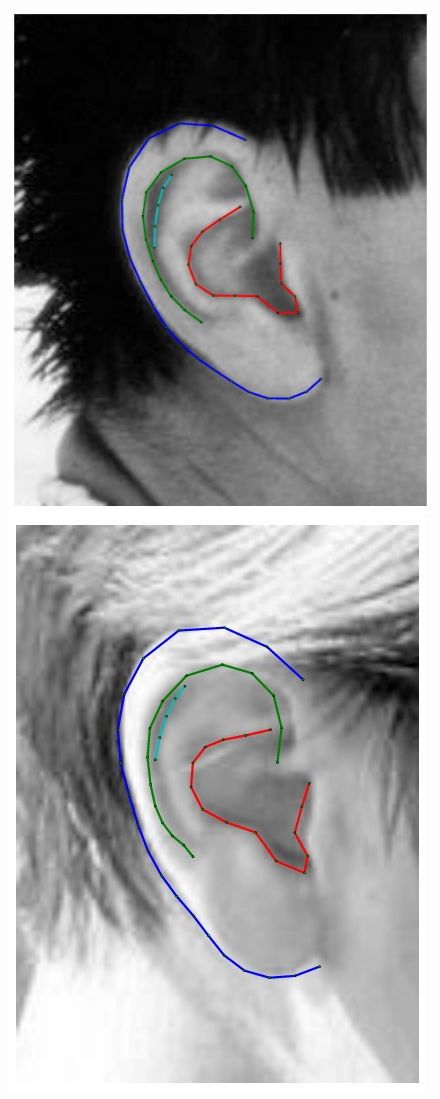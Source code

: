 \begin{figure}
    \hfill
    \includegraphics[height=\flowhh]{resources/Ear_Deformable_Model/fittings/final_0022}
    \hfill
    \includegraphics[height=\flowhh]{resources/Ear_Deformable_Model/fittings/final_0023}

\end{figure}

